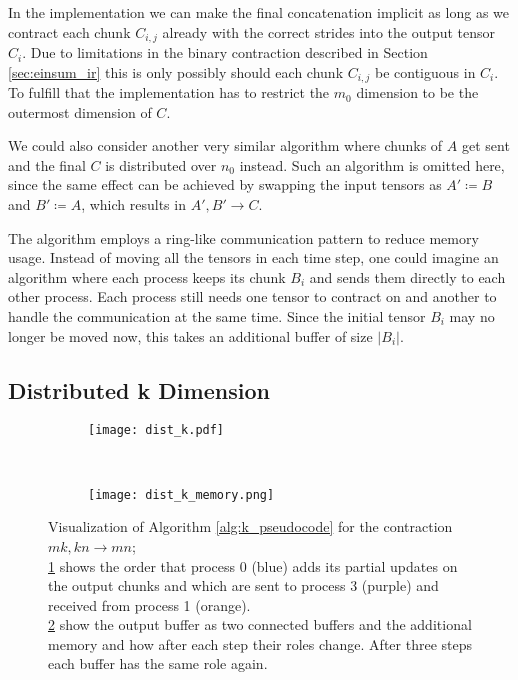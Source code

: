In the implementation we can make the final concatenation implicit as long as we contract each chunk $C_{i,j}$ already with the correct strides into the output tensor $C_i$.
Due to limitations in the binary contraction described in Section \ref{sec:einsum_ir} this is only possibly should each chunk $C_{i,j}$ be contiguous in $C_i$.
To fulfill that the implementation has to restrict the $m_0$ dimension to be the outermost dimension of $C$.

We could also consider another very similar algorithm where chunks of $A$ get sent and the final $C$ is distributed over $n_0$ instead.
Such an algorithm is omitted here, since the same effect can be achieved by swapping the input tensors as $A' \coloneqq B$ and $B' \coloneqq A$, which results in $A',B' \rightarrow C$.

The algorithm employs a ring-like communication pattern to reduce memory usage.
Instead of moving all the tensors in each time step, one could imagine an algorithm where each process keeps its chunk $B_i$ and sends them directly to each other process.
Each process still needs one tensor to contract on and another to handle the communication at the same time.
Since the initial tensor $B_i$ may no longer be moved now, this takes an additional buffer of size $|B_i|$.

\subsection{Distributed k Dimension}

\begin{figure}[ht]
    \centering
    \begin{subfigure}[t]{0.6\textwidth}
        \centering
        \texttt{[image: dist\_k.pdf]}
        \label{fig:k_algo_a}
    \end{subfigure}
    ~
    \begin{subfigure}[t]{0.35\textwidth}
        \centering\texttt{[image: dist\_k\_memory.png]}
        \label{fig:k_algo_b}
    \end{subfigure}
    \caption{Visualization of Algorithm \ref{alg:k_pseudocode} for the contraction $mk,kn \rightarrow mn$;\\
    \ref{fig:k_algo_a} shows the order that process 0 (blue) adds its partial updates on the output chunks and which are sent to process 3 (purple) and received from process 1 (orange).\\
    \ref{fig:k_algo_b} show the output buffer as two connected buffers and the additional memory and how after each step their roles change.
    After three steps each buffer has the same role again.
    }
    \label{fig:k_algo}
\end{figure}


